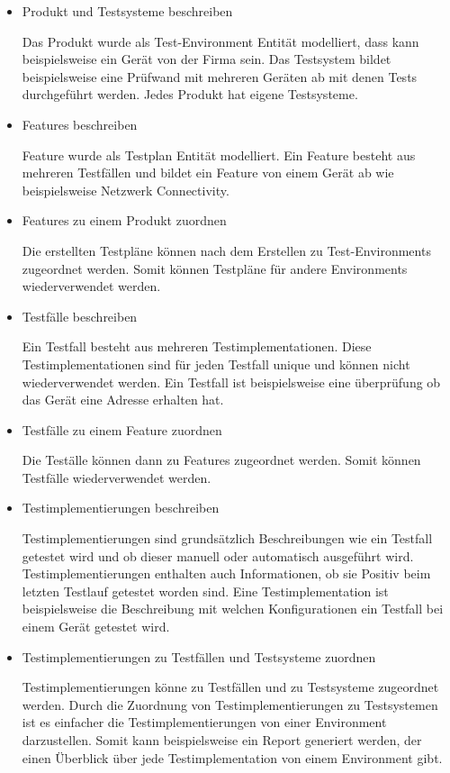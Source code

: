 \documentclass[a4paper, fontsize=11pt, parskip=half, twoside]{scrreprt}
\begin{document}
	\begin{itemize}
		\item Produkt und Testsysteme beschreiben
		
		Das Produkt wurde als Test-Environment Entität modelliert, dass kann beispielsweise ein Gerät von der Firma sein.
		Das Testsystem bildet beispielsweise eine Prüfwand mit mehreren Geräten ab mit denen Tests durchgeführt werden.
		Jedes Produkt hat eigene Testsysteme.
		
		\item Features beschreiben
		
		Feature wurde als Testplan Entität modelliert.
		Ein Feature besteht aus mehreren Testfällen und bildet ein Feature von einem Gerät ab wie beispielsweise Netzwerk Connectivity.
		
		\item Features zu einem Produkt zuordnen
		
		Die erstellten Testpläne können nach dem Erstellen zu Test-Environments zugeordnet werden.
		Somit können Testpläne für andere Environments wiederverwendet werden.
		
		\item Testfälle beschreiben
		
	    Ein Testfall besteht aus mehreren Testimplementationen.
	    Diese Testimplementationen sind für jeden Testfall unique und können nicht wiederverwendet werden. 
	    Ein Testfall ist beispielsweise eine überprüfung ob das Gerät eine  Adresse erhalten hat.
		
		\item Testfälle zu einem Feature zuordnen
		
		Die Teställe können dann zu Features zugeordnet werden.
		Somit können Testfälle wiederverwendet werden.
		
		\item Testimplementierungen beschreiben
		
		Testimplementierungen sind grundsätzlich Beschreibungen wie ein Testfall getestet wird und ob dieser manuell oder automatisch ausgeführt wird.
		Testimplementierungen enthalten auch Informationen, ob sie Positiv beim letzten Testlauf getestet worden sind.
		Eine Testimplementation ist beispielsweise die Beschreibung mit welchen Konfigurationen ein Testfall bei einem Gerät getestet wird.
		
		\item Testimplementierungen zu Testfällen und Testsysteme zuordnen
		
		Testimplementierungen könne zu Testfällen und zu Testsysteme zugeordnet werden.
		Durch die Zuordnung von Testimplementierungen zu Testsystemen ist es einfacher die Testimplementierungen von einer Environment darzustellen.
		Somit kann beispielsweise ein Report generiert werden, der einen Überblick über jede Testimplementation von einem Environment gibt.
	\end{itemize}
\end{document}
